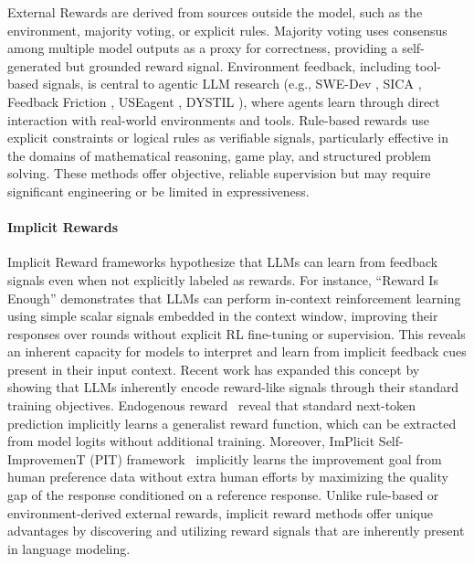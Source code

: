 \documentclass[10pt]{article} %
\begin{document}
External Rewards are derived from sources outside the model, such as the environment, majority voting, or explicit rules. Majority voting \citep{shafayat2025largereasoningmodelsselftrain, wei2025unsupervisedposttrainingmultimodalllm, zhang2025consistentpathsleadtruth} uses consensus among multiple model outputs as a proxy for correctness, providing a self-generated but grounded reward signal. Environment feedback, including tool-based signals, is central to agentic LLM research (e.g., SWE-Dev \citep{du2025swedevevaluatingtrainingautonomous}, SICA \citep{robeyns2025self}, Feedback Friction \citep{jiang2025feedbackfriction}, USEagent \citep{applis2025useagent}, DYSTIL \citep{wang2025dystildynamicstrategyinduction}), where agents learn through direct interaction with real-world environments and tools. Rule-based rewards \citep{wang2025otcpo, wang2025autorule, zhang2025learning, simonds2025ladder, wang2025ragen, liu2025spiral} use explicit constraints or logical rules as verifiable signals, particularly effective in the domains of mathematical reasoning, game play, and structured problem solving. These methods offer objective, reliable supervision but may require significant engineering or be limited in expressiveness.

\paragraph{Implicit Rewards}


Implicit Reward frameworks hypothesize that LLMs can learn from feedback signals even when not explicitly labeled as rewards. For instance, “Reward Is Enough” \citep{song2025reward} demonstrates that LLMs can perform in-context reinforcement learning using simple scalar signals embedded in the context window, improving their responses over rounds without explicit RL fine-tuning or supervision. This reveals an inherent capacity for models to interpret and learn from implicit feedback cues present in their input context. Recent work has expanded this concept by showing that LLMs inherently encode reward-like signals through their standard training objectives. 
Endogenous reward~\citep{li2025generalist} reveal that standard next-token prediction implicitly learns a generalist reward function, which can be extracted from model logits without additional training. Moreover, ImPlicit Self-ImprovemenT (PIT) framework~\citep{wang2024enabling} implicitly learns the improvement goal
from human preference data without extra human efforts by maximizing the quality
gap of the response conditioned on a reference response. Unlike rule-based or environment-derived external rewards, implicit reward methods offer unique advantages by discovering and utilizing reward signals that are inherently present in language modeling.
\end{document}
